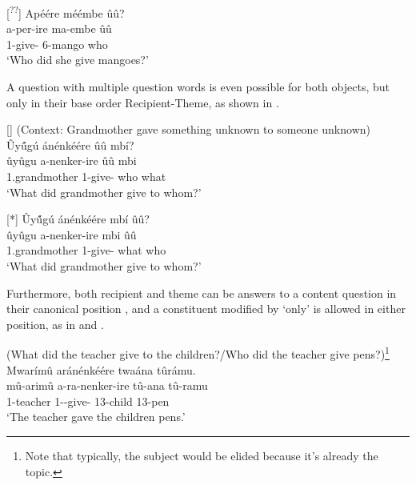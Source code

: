\documentclass[output=paper]{langscibook}
\begin{document}
\ex
[\textsuperscript{??}]{
Apéére méémbe ûû?\\
\gll
a-per-ire  ma-embe  ûû\\
1\SM{}-give-\PFV{} 6-mango  who \\
\glt
‘Who did she give mangoes?’
}

\z
\z

A question with multiple question words is even possible for both objects, but only in their base order Recipient-Theme, as shown in .

\ea
\label{bkm:Ref89972049}
\ea
[]{
(Context: Grandmother gave something unknown to someone unknown)\\
Ûy\'{û}gú ánénkéére ûû mbí?\\
\gll
ûyûgu  a-nenker-ire  ûû  mbi\\
1.grandmother 1\SM{}-give-\PFV{}  who  what\\
\glt
‘What did grandmother give to whom?’
}

\ex
[*]{
Ûy\'{û}gú ánénkéére mbí ûû?\\
\gll
ûyûgu  a-nenker-ire  mbi  ûû\\
1.grandmother 1\SM{}-give-\PFV{}  what  who\\
\glt
‘What did grandmother give to whom?’
}

\z
\z

Furthermore, both recipient and theme can be answers to a content question in their canonical position , and a constituent modified by ‘only’ is allowed in either position, as in  and .

\ea
\label{bkm:Ref89972080}
(What did the teacher give to the children?\slash Who did the teacher give pens?)\footnote{Note that typically, the subject would be elided because it’s already the topic.}\\
Mwarímû aránénkéére twaána tûrámu.\\
\gll
mû-arimû  a-ra-nenker-ire  tû-ana  tû-ramu\\
1-teacher 1\SM-\YPST{}-give-\PFV{} 13-child  13-pen\\
\glt
‘The teacher gave the children pens.’
\end{document}
